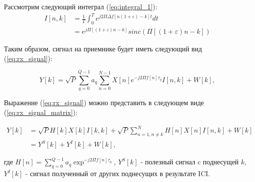 \noindent Рассмотрим следующий интеграл (\ref{eq:integral_1}):
\begin{equation}
    \label{eq:integral_1}
    \begin{split}
        I[n, k] &= \frac{1}{T} \int_{0}^{T}  e^{j 2 \Pi \Delta f [n (1 + \varepsilon ) - k] t}dt \\
                &= e^{j \Pi [(1 + \varepsilon )n - k]} sinc(\Pi [ (1 + \varepsilon) n - k])
    \end{split}
\end{equation}

\noindent Таким образом, сигнал на приемнике будет иметь следующий вид (\ref{eq:rx_signal}):

\begin{equation}
    Y[k] = \sqrt{P} \sum_{q = 0}^{Q - 1} a_q \sum_{n = 0}^{N-1} X[n] e^{-j2 \Pi f[n]\tau_q} I[n, k] + W[k],
    \label{eq:rx_signal}
\end{equation}

\noindent Выражение (\ref{eq:rx_signal}) можно представить в следующем виде (\ref{eq:rx_signal_matrix}):

\begin{equation}
    \label{eq:rx_signal_matrix}
    \begin{split}
    Y[k] &= \sqrt{P} H[k] X[k] I[k, k] + \sqrt{P} \sum_{n = 1, n \neq k}^{N} H[n] X[n] I[n, k] + W[k] \\
         &= Y^S[k] + Y^I[k] + W[k],
    \end{split}
\end{equation}

\noindent где $H[n] = \sum_{q = 0}^{Q - 1} a_q \exp^{-j2 \Pi f[n]\tau_q}$,
$Y^S[k]$ - полезный сигнал c поднесущей $k$, $Y^I[k]$ 
- сигнал полученный от других поднесущих в результате ICI.

